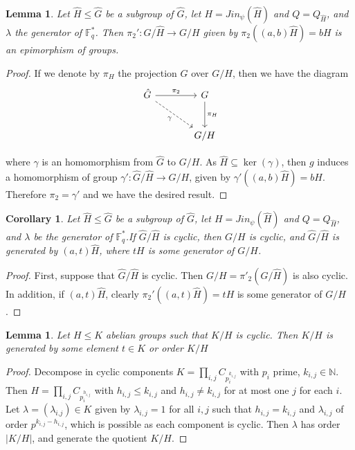 \documentclass{article}
\newtheorem{lemma}[theorem]{Lemma}
\newtheorem{corollary}[theorem]{Corollary}
\begin{document}
\begin{lemma}
    Let $\hat{H}\leq \hat{G}$ be a subgroup of $\hat{G}$, let $H=Jin_\psi(\hat{H})$ and $Q=Q_{\hat{H}}$, and $\lambda$ the generator of $\mathbb{F}_q^*$. Then $\pi_2' : \hat{G} / \hat{H} \longrightarrow G/H$ given by $\pi_2((a,b)\hat{H}) = bH$ is an epimorphism of groups.
\end{lemma}
\begin{proof}
If we denote by $\pi_H $ the projection $G$ over $G/H$, then we have the diagram
    \[
\begin{tikzcd}[row sep=large, column sep=large]
\hat{G} \arrow[r, "\pi_2"] \arrow[rd, dashed, "\gamma"'] & G \arrow[d, "\pi_H"] \\
& G/H
\end{tikzcd}
\]

where $\gamma$ is an homomorphism from $\hat{G}$ to $G/H$. As $\hat{H} \subseteq\ker(\gamma)$, then $g$ induces a homomorphism of group $\gamma':\hat{G}/\hat{H} \longrightarrow G/H$, given by $\gamma'((a,b)\hat{H}) = bH$. Therefore $\pi_2 = \gamma'$ and we have the desired result.
\end{proof}



\begin{corollary}
        Let $\hat{H}\leq \hat{G}$ be a subgroup of $\hat{G}$, let $H=Jin_\psi(\hat{H})$ and $Q=Q_{\hat{H}}$, and $\lambda$ be the generator of $\mathbb{F}_q^*$.If $\hat{G}/ \hat{H}$ is cyclic, then $G/H$ is cyclic, and $\hat{G}/ \hat{H}$ is generated by $(a,t)\hat{H}$, where $t H$ is some generator of $G/H$. 
\end{corollary}
\begin{proof}
 First, suppose that $\hat{G}/\hat{H}$ is cyclic. Then $G/H =\pi'_2(\hat{G}/ \hat{H})$ is also cyclic. In addition, if $(a,t)\hat{H}$, clearly $ \pi_2'( (a,t) \hat{H}) =t H$ is some generator of $G/H$.

\end{proof}

\begin{lemma}
    Let $H\leq K$ abelian groups such that $K/H$ is cyclic. Then $K/H$ is generated by some element $t\in K$ or order $K/H$ 
\end{lemma}
\begin{proof}
    Decompose in cyclic components $K= \prod_{i,j} C_{p_i^{k_{i,j}}}$ with $p_i$ prime, $k_{i,j}\in \mathbb{N}$. Then $H=\prod_{i,j} C_{p_i^{h_{i,j}}}$ with $h_{i,j} \leq k_{i,j}$ and $h_{i,j} \not = k_{i,j}$ for at most one $j$ for each $i$. Let $\lambda=(\lambda_{i.j}) \in K$ given by $\lambda_{i,j}=1$ for all $i,j$ such that $h_{i,j}  = k_{i,j}$ and $\lambda_{i,j}$ of order $p^{k_{i,j}-h_{i,j}}$, which is possible as each component is cyclic. Then $\lambda$ has order $|K/H|$, and generate the quotient $K/H$.
\end{proof}
\end{document}
